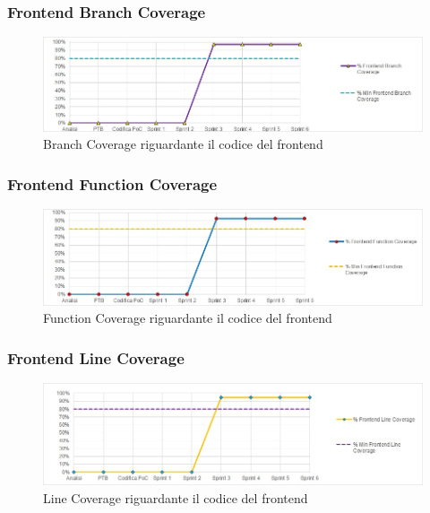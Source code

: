 \subsubsection{Frontend Branch Coverage}
\begin{figure}[H]
  \centering
  \includegraphics[scale=0.8]{immagini/frontend_branch.jpg}
  \caption{Branch Coverage riguardante il codice del frontend}
\end{figure}

\subsubsection{Frontend Function Coverage}
\begin{figure}[H]
  \centering
  \includegraphics[scale=0.8]{immagini/frontend_function.jpg}
  \caption{Function Coverage riguardante il codice del frontend}
\end{figure}

\subsubsection{Frontend Line Coverage}
\begin{figure}[H]
  \centering
  \includegraphics[scale=0.8]{immagini/frontend_line.jpg}
  \caption{Line Coverage riguardante il codice del frontend}
\end{figure}